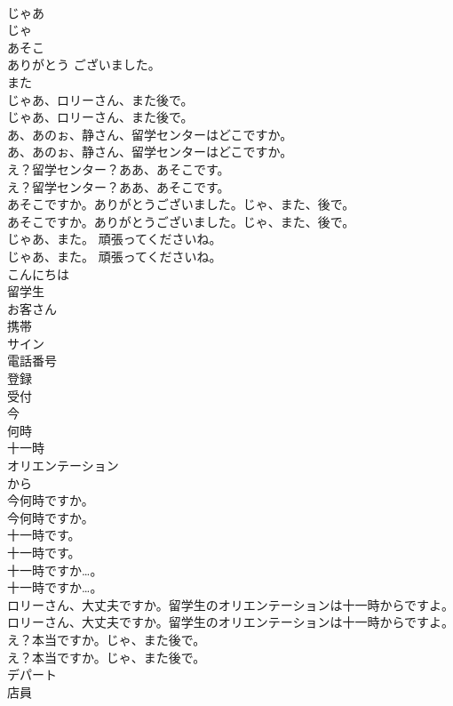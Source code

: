 \documentclass[8pt]{extreport}
\begin{document}
\begin{CJK}{UTF8}{min}
\\	じゃあ 
\\	じゃ
\\	あそこ
\\	ありがとう ございました。
\\	また
\\	じゃあ、ロリーさん、また後で。	
\\	じゃあ、ロリーさん、また後で。 
\\	あ、あのぉ、静さん、留学センターはどこですか。	
\\	あ、あのぉ、静さん、留学センターはどこですか。 
\\	え？留学センター？ああ、あそこです。	
\\	え？留学センター？ああ、あそこです。 
\\	あそこですか。ありがとうございました。じゃ、また、後で。	
\\	あそこですか。ありがとうございました。じゃ、また、後で。 
\\	じゃあ、また。 頑張ってくださいね。	
\\	じゃあ、また。 頑張ってくださいね。 
\\	こんにちは
\\	留学生
\\	お客さん
\\	携帯
\\	サイン
\\	電話番号
\\	登録
\\	受付
\\	今
\\	何時
\\	十一時
\\	オリエンテーション
\\	から
\\	今何時ですか。	
\\	今何時ですか。 
\\	十一時です。	
\\	十一時です。 
\\	十一時ですか…。	
\\	十一時ですか…。 
\\	ロリーさん、大丈夫ですか。留学生のオリエンテーションは十一時からですよ。	
\\	ロリーさん、大丈夫ですか。留学生のオリエンテーションは十一時からですよ。 
\\	え？本当ですか。じゃ、また後で。	
\\	え？本当ですか。じゃ、また後で。 
\\	デパート
\\	店員

\end{CJK}
\end{document}
